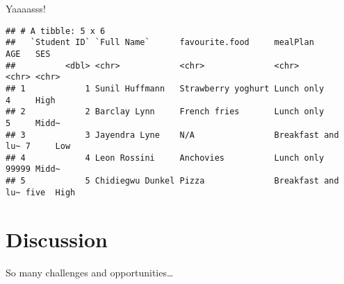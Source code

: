 \documentclass[12pt]{article}
\begin{document}
Yaaaasss!

\begin{verbatim}
## # A tibble: 5 x 6
##   `Student ID` `Full Name`      favourite.food     mealPlan          AGE   SES  
##          <dbl> <chr>            <chr>              <chr>             <chr> <chr>
## 1            1 Sunil Huffmann   Strawberry yoghurt Lunch only        4     High 
## 2            2 Barclay Lynn     French fries       Lunch only        5     Midd~
## 3            3 Jayendra Lyne    N/A                Breakfast and lu~ 7     Low  
## 4            4 Leon Rossini     Anchovies          Lunch only        99999 Midd~
## 5            5 Chidiegwu Dunkel Pizza              Breakfast and lu~ five  High
\end{verbatim}

\hypertarget{discussion}{%
\section{Discussion}\label{discussion}}

So many challenges and opportunities\ldots{}

\newpage



\end{document}
